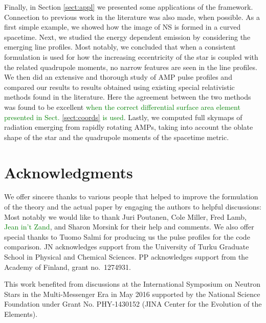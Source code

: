 \documentclass{aa}
\newcommand{\red}[1]{\textcolor{red}{#1}}
\newcommand{\refe}[1]{\textcolor{green}{{#1}}}
\begin{document}
Finally, in Section \ref{sect:appl} we presented some applications of the framework.
Connection to previous work in the literature was also made, when possible.
As a first simple example, we showed how the image of NS is formed in a curved spacetime.
Next, we studied the energy dependent emission by considering the emerging line profiles.
Most notably, we concluded that when a consistent formulation is used for how the increasing eccentricity of the star is coupled with the related quadrupole moments, no narrow features are seen in the line profiles.
We then did an extensive and thorough study of AMP pulse profiles and compared our results to results obtained using existing special relativistic methods found in the literature.
Here the agreement between the two methods was found to be excellent \refe{when the correct differential surface area element presented in Sect. \ref{sect:coords} is used}.
Lastly, we computed full skymaps of radiation emerging from rapidly rotating AMPs, taking into account the oblate shape of the star and the quadrupole moments of the spacetime metric.



\section*{Acknowledgments}

\small{
We offer sincere thanks to various people that helped to improve the formulation of the theory and the actual paper by engaging the authors to helpful discussions: 
Most notably we would like to thank Juri Poutanen, Cole Miller, Fred Lamb, \refe{Jean in't Zand}, and Sharon Morsink for their help and comments.
We also offer special thanks to Tuomo Salmi for producing us the pulse profiles for the code comparison.
JN acknowledges support from the University of Turku Graduate School in Physical and Chemical Sciences.
PP acknowledges support from the Academy of Finland, grant no.~1274931.

This work benefited from discussions at the International Symposium on Neutron Stars in the Multi-Messenger Era in May 2016 supported by the National Science Foundation under Grant No. PHY-1430152 (JINA Center for the Evolution of the Elements).
}




\end{document}
